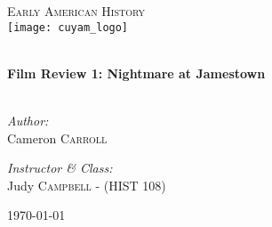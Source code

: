 \begin{titlepage}
\begin{center}

\textsc{\Large Early American History}\\[0.5cm]
\texttt{[image: cuyam\_logo]}

\HRule \\[0.4cm]
{ \LARGE \bfseries Film Review 1: Nightmare at Jamestown}\\[0.5cm]

\HRule \\[1.5cm]

\begin{minipage}{0.4\textwidth}
\begin{flushleft} \large
\emph{Author:}\\
Cameron \textsc{Carroll}
\end{flushleft}
\end{minipage}
\begin{minipage}{0.4\textwidth}
\begin{flushright} \large
\emph{Instructor \& Class:}\\
Judy \textsc{Campbell} - (HIST 108)
\end{flushright}
\end{minipage}

\vfill

{\large \today}

\end{center}
\end{titlepage}
